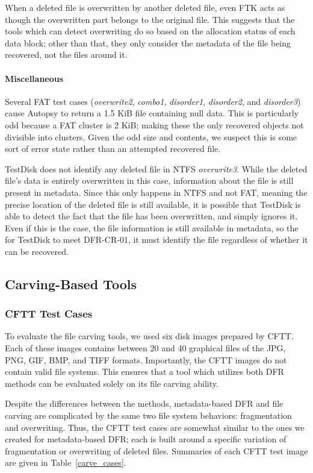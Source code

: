When a deleted file is overwritten by another deleted file, even FTK acts as though the overwritten part belongs to the original file.
This suggests that the tools which can detect overwriting do so based on the allocation status of each data block; other than that, they only consider the metadata of the file being recovered, not the files around it.

\paragraph{Miscellaneous}
Several FAT test cases (\emph{overwrite2}, \emph{combo1}, \emph{disorder1}, \emph{disorder2}, and \emph{disorder3}) cause Autopsy to return a 1.5 KiB file containing null data.
This is particularly odd because a FAT cluster is 2 KiB; making these the only recovered objects not divisible into clusters.
Given the odd size and contents, we suspect this is some sort of error state rather than an attempted recovered file.

TestDisk does not identify any deleted file in NTFS \emph{overwrite3}.
While the deleted file's data is entirely overwritten in this case, information about the file is still present in metadata.
Since this only happens in NTFS and not FAT, meaning the precise location of the deleted file is still available, it is possible that TestDisk is able to detect the fact that the file has been overwritten, and simply ignores it.
Even if this is the case, the file information is still available in metadata, so the for TestDisk to meet DFR-CR-01, it must identify the file regardless of whether it can be recovered.


\subsection{Carving-Based Tools}

\subsubsection{CFTT Test Cases}
To evaluate the file carving tools, we used six disk images prepared by CFTT\cite{cftt_carving_images}.
Each of these images contains between 20 and 40 graphical files of the JPG, PNG, GIF, BMP, and TIFF formats.
Importantly, the CFTT images do not contain valid file systems.
This ensures that a tool which utilizes both DFR methods can be evaluated solely on its file carving ability.

Despite the differences between the methods, metadata-based DFR and file carving are complicated by the same two file system behaviors: fragmentation and overwriting. Thus, the CFTT test cases are somewhat similar to the ones we created for metadata-based DFR; each is built around a specific variation of fragmentation or overwriting of deleted files.
Summaries of each CFTT test image are given in Table~\ref{carve_cases}.

